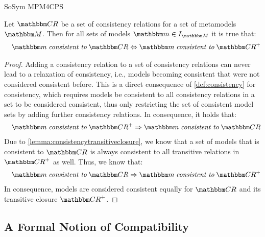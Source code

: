 \begin{copiedFrom}{SoSym MPM4CPS}
\begin{lemma} \label{lemma:consistencytransitiveclosure}
    Let $\consistencyrelationset{CR}$ be a set of consistency relations for a set of metamodels $\metamodelset{M}$.
    Then for all sets of models $\modelset{m} \in \metamodelinstances{\metamodelset{M}}$ it is true that:
    \begin{align*}
        \formulaskip
        \modelset{m} \mathtext{consistent to} \consistencyrelationset{CR} \equivalent
        \modelset{m} \mathtext{consistent to} \transitiveclosure{\consistencyrelationset{CR}}
    \end{align*}
\end{lemma}

\begin{proof}
    Adding a consistency relation to a set of consistency relations can never lead to a relaxation of consistency, i.e., models becoming consistent that were not considered consistent before. This is a direct consequence of \autoref{def:consistency} for consistency, which requires models be consistent to all consistency relations in a set to be considered consistent, thus only restricting the set of consistent model sets by adding further consistency relations.
    In consequence, it holds that:
    \begin{align*}
        \formulaskip
        \modelset{m} \mathtext{consistent to} \transitiveclosure{\consistencyrelationset{CR}} \Rightarrow \modelset{m} \mathtext{consistent to} \consistencyrelationset{CR}
    \end{align*}
    Due to \autoref{lemma:consistencytransitiveclosure}, we know that a set of models that is consistent to $\consistencyrelationset{CR}$ is always consistent to all transitive relations in $\transitiveclosure{\consistencyrelationset{CR}}$ as well. Thus, we know that:
    \begin{align*}
        \formulaskip
        \modelset{m} \mathtext{consistent to} \consistencyrelationset{CR} \Rightarrow
        \modelset{m} \mathtext{consistent to} \transitiveclosure{\consistencyrelationset{CR}}
    \end{align*}
    In consequence, models are considered consistent equally for $\consistencyrelationset{CR}$ and its transitive closure $\transitiveclosure{\consistencyrelationset{CR}}$.
\end{proof}


\subsection{A Formal Notion of Compatibility}


\end{copiedFrom}

